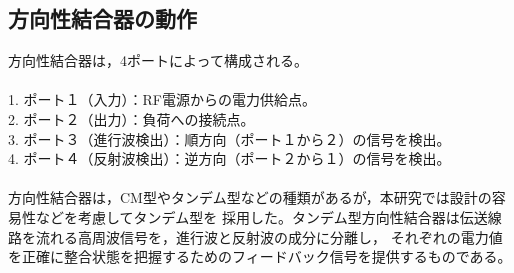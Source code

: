 \documentclass[uplatex, 12pt,oneside,openany]{ujbook}
\begin{document}
 \subsection{方向性結合器の動作}
 方向性結合器は，4ポートによって構成される。\\\\
 1. ポート１（入力）：RF電源からの電力供給点。\\
 2. ポート２（出力）：負荷への接続点。\\
 3. ポート３（進行波検出）：順方向（ポート１から２）の信号を検出。\\
 4. ポート４（反射波検出）：逆方向（ポート２から１）の信号を検出。\\\\
 方向性結合器は，CM型やタンデム型などの種類があるが，本研究では設計の容易性などを考慮してタンデム型を
 採用した。タンデム型方向性結合器は伝送線路を流れる高周波信号を，進行波と反射波の成分に分離し，
それぞれの電力値を正確に整合状態を把握するためのフィードバック信号を提供するものである。\\
\end{document}
